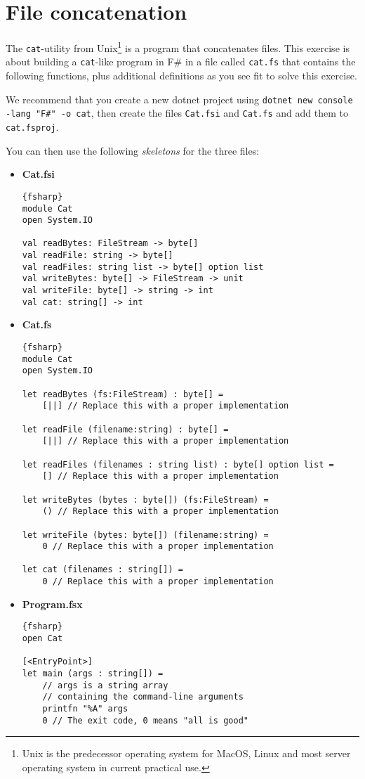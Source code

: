 \section*{File concatenation}

The \texttt{cat}-utility from 
Unix\footnote{Unix is the predecessor operating system for MacOS, Linux and most server operating system in current practical use.} 
is a program that concatenates files.  
This exercise is about building a \texttt{cat}-like program in F\# in a file called \texttt{cat.fs} that contains the following functions, plus additional definitions as you see fit to solve this exercise.

We recommend that you create a new dotnet project using \texttt{dotnet new console -lang "F\#" -o cat}, then create the files \texttt{Cat.fsi} and \texttt{Cat.fs} and add them to \texttt{cat.fsproj}.


You can then use the following \textit{skeletons} for the three files:

\begin{itemize}
\item \textbf{Cat.fsi} \\
  \begin{lstlisting}{fsharp}
module Cat
open System.IO

val readBytes: FileStream -> byte[]
val readFile: string -> byte[]
val readFiles: string list -> byte[] option list
val writeBytes: byte[] -> FileStream -> unit
val writeFile: byte[] -> string -> int
val cat: string[] -> int
  \end{lstlisting}
\item \textbf{Cat.fs} \\
  \begin{lstlisting}{fsharp}
module Cat
open System.IO

let readBytes (fs:FileStream) : byte[] =
    [||] // Replace this with a proper implementation

let readFile (filename:string) : byte[] =
    [||] // Replace this with a proper implementation

let readFiles (filenames : string list) : byte[] option list =
    [] // Replace this with a proper implementation

let writeBytes (bytes : byte[]) (fs:FileStream) =
    () // Replace this with a proper implementation

let writeFile (bytes: byte[]) (filename:string) =
    0 // Replace this with a proper implementation

let cat (filenames : string[]) =
    0 // Replace this with a proper implementation
  \end{lstlisting}
\item \textbf{Program.fsx} \\
  \begin{lstlisting}{fsharp}
open Cat

[<EntryPoint>]
let main (args : string[]) =
    // args is a string array
    // containing the command-line arguments
    printfn "%A" args 
    0 // The exit code, 0 means "all is good"
  \end{lstlisting}
\end{itemize}



